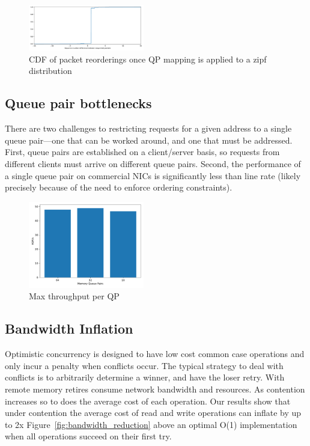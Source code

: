 \begin{figure}[t]
    \includegraphics[width=0.45\textwidth]{fig/qp_reordering.pdf}
    \caption{CDF of packet reorderings once QP mapping is applied to a zipf distribution}
    \label{fig:reorder}
\end{figure}

\subsection{Queue pair bottlenecks}

 There are two challenges to restricting requests for a given address
 to a single queue pair---one that can be worked around, and one that
 must be addressed.  First, queue pairs are established on a
 client/server basis, so requests from different clients must arrive
 on different queue pairs.  Second, the performance of a single queue
 pair on commercial NICs is significantly less than line rate (likely
 precisely because of the need to enforce ordering constraints).

\begin{figure}[t]
    \includegraphics[width=0.45\textwidth]{fig/qp_bottleneck.pdf}
    \caption{Max throughput per QP }
    \label{fig:qp_bottleneck}
\end{figure}

\subsection{Bandwidth Inflation} 

Optimistic concurrency is designed to have low cost common case operations and
only incur a penalty when conflicts occur. The typical strategy to deal with
conflicts is to arbitrarily determine a winner, and have the loser retry. With
remote memory retires consume network bandwidth and resources. As contention
increases so to does the average cost of each operation. Our results show that
under contention the average cost of read and write operations can inflate by up
to 2x Figure~\ref{fig:bandwidth_reduction} above an optimal O(1) implementation when
all operations succeed on their first try.

